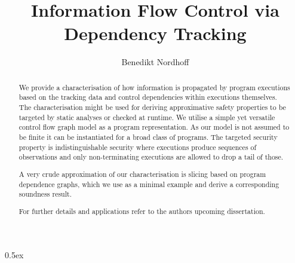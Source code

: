 \documentclass[11pt,a4paper]{article}
\begin{document}
\title{Information Flow Control via Dependency Tracking}
\author{Benedikt Nordhoff}
\maketitle

\begin{abstract}
  We provide a characterisation of how information is propagated by program executions based on the
  tracking data and control dependencies within executions themselves.  The characterisation might
  be used for deriving approximative safety properties to be targeted by static analyses or checked
  at runtime.  We utilise a simple yet versatile control flow graph model as a program
  representation.  As our model is not assumed to be finite it can be instantiated for a broad class
  of programs.  The targeted security property is indistinguishable security where executions
  produce sequences of observations and only non-terminating executions are allowed to drop a tail
  of those.

  A very crude approximation of our characterisation is slicing based on program dependence graphs,
  which we use as a minimal example and derive a corresponding soundness result.

  For further details and applications refer to the authors upcoming dissertation.
\end{abstract}

\newpage

\tableofcontents

\newpage

\parindent 0pt\parskip 0.5ex



\nocite{Bohannon:2009:RN:1653662.1653673}



\end{document}
